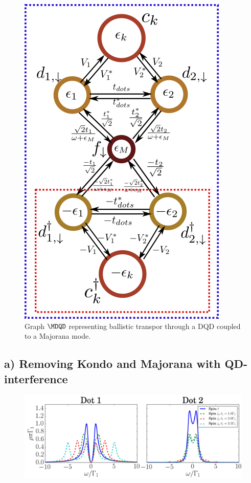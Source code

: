 \begin{figure}[H]
\centering
\includegraphics[scale=0.60]{IMAGES/Graphs/DQD-Majorana.png}
\caption{\label{fig:Graph-MDQD} Graph $\MDQD$ representing ballistic transpor through a DQD coupled to a Majorana mode. \protect{}} 
\end{figure}



\newpage


\subsection{ a) Removing Kondo and Majorana with QD-interference \label{sec:a)}}

\begin{figure}[H]
    \centering
    \includegraphics[scale=0.35]{IMAGES/DQD-M/a)}
    \caption{\label{fig:a)} \protect{}}
\end{figure}

